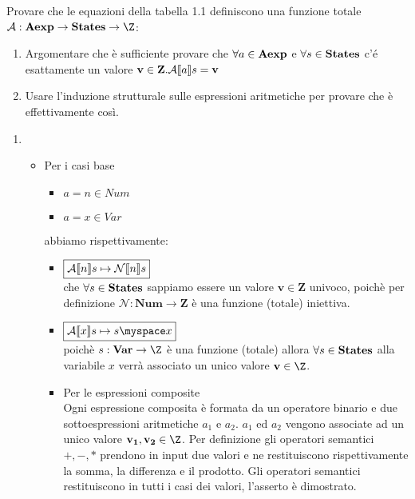 {Provare che le equazioni della tabella 1.1 definiscono una funzione totale 
$\mathcal{A}:\aexp \rightarrow \states \rightarrow \Z$: 
	\begin{enumerate}[label=\alph*)]
		\item Argomentare che è sufficiente provare che  
$\forall a \in \textbf{Aexp}$ e $\forall s \in \textbf{States}$
		c'é esattamente un valore $\mathbf{v} \in \mathbf{Z}.\mathcal{A} \llbracket a \rrbracket s = 
\mathbf{v}$
		\item Usare l'induzione strutturale sulle espressioni 
aritmetiche per provare che è effettivamente così.
	\end{enumerate}
}
{	
	\begin{enumerate}
		\item 
                \begin{itemize}
                  \item Per i casi base
                    \begin{itemize}
                            \item $\boxed{a = n \in Num}$
                            \item $\boxed{a = x \in Var}$
                    \end{itemize} 
                    abbiamo rispettivamente:
                    \begin{itemize}
                            \item $\boxed{\mathcal{A} \llbracket n \rrbracket s \mapsto \mathcal{N} \llbracket n \rrbracket s}$ \\
                              che $\forall s \in \textbf{States}$ sappiamo essere un 
                              valore $\mathbf{v} \in \mathbf{Z}$ univoco, poichè 
                              per definizione $\mathcal{N}:\mathbf{Num} 
                              \rightarrow \mathbf{Z}$ è una funzione (totale) 
                              iniettiva.
                            \item $\boxed{\A{x} \mapsto s\myspace x}$ \\
                              poichè $s:\var \rightarrow \Z$ è una funzione 
                              (totale) allora $\forall s \in \textbf{States}$ 
                              alla variabile $x$ verrà associato un unico valore 
                              $\mathbf{v} \in \Z$.
			
		  \item Per le espressioni composite \\
                        Ogni espressione composita è formata da un operatore 
                        binario e due sottoespressioni aritmetiche $a_1$ e 
                        $a_2$. $a_1$ ed $a_2$ vengono associate ad un unico 
                        valore $\mathbf{v_1}, \mathbf{v_2} \in \Z$.
			Per definizione gli operatori semantici $+, -, *$ 
                        prendono in input due valori e ne restituiscono 
                        rispettivamente la somma, la differenza e il prodotto. 
                        Gli operatori semantici restituiscono in tutti i
                        casi dei valori, l'asserto è dimostrato.
	        \end{itemize}	
			

\end{itemize}
\end{enumerate}}
